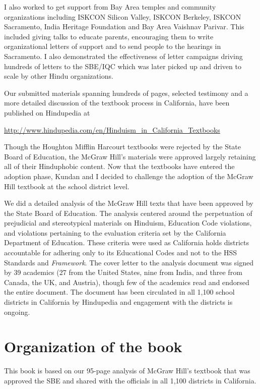 I also worked to get support from Bay Area temples and community organizations including ISKCON Silicon Valley, ISKCON Berkeley, ISKCON Sacramento, India Heritage Foundation and Bay Area Vaishnav Parivar. This included giving talks to educate parents, encouraging them to write organizational letters of support and to send people to the hearings in Sacramento. I also demonstrated the effectiveness of letter campaigns driving hundreds of letters to the SBE/IQC which was later picked up and driven to scale by other Hindu organizations.

Our submitted materials spanning hundreds of pages, selected testimony and a more detailed discussion of the textbook process in California, have been published on Hindupedia at 

{\small\url{http://www.hindupedia.com/en/Hinduism_in_California_Textbooks}}

Though the Houghton Mifflin Harcourt textbooks were rejected by the State Board of Education, the McGraw Hill’s materials were approved largely retaining all of their Hinduphobic content. Now that the textbooks have entered the adoption phase, Kundan and I decided to challenge the adoption of the McGraw Hill textbook at the school district level. 

We did a detailed analysis of the McGraw Hill texts that have been approved by the State Board of Education. The analysis centered around the perpetuation of prejudicial and stereotypical materials on Hinduism, Education Code violations, and violations pertaining to the evaluation criteria set by the California Department of Education. These criteria were used as California holds districts accountable for adhering only to its Educational Codes and not to the HSS Standards and \textit{Framework}. The cover letter to the analysis document was signed by 39 academics (27 from the United States, nine from India, and three from Canada, the UK, and Austria), though  few of the academics read and endorsed the entire document. The document has been circulated in all 1,100 school districts in California by Hindupedia and engagement with the districts is ongoing.

\section*{Organization of the book}
\vskip -5pt

This book is based on our 95-page analysis of McGraw Hill’s textbook that was approved the SBE and shared with the officials in all 1,100 districts in California. 

